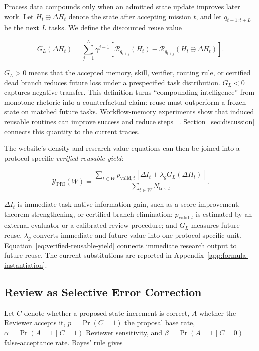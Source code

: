 Process data compounds only when an admitted state update improves later work. Let
$H_t\oplus\Delta H_t$ denote the state after accepting mission $t$, and let
$q_{t+1:t+L}$ be the next $L$ tasks. We define the discounted reuse value

\begin{equation}
  G_L(\Delta H_t)
  =\sum_{j=1}^{L}\gamma^{j-1}
  \left[
    \mathcal{R}_{q_{t+j}}(H_t)
    -\mathcal{R}_{q_{t+j}}(H_t\oplus\Delta H_t)
  \right].
  \label{eq:reuse-gain}
\end{equation}

$G_L>0$ means that the accepted memory, skill, verifier, routing rule, or certified
dead branch reduces future loss under a prespecified task distribution. $G_L<0$
captures negative transfer. This definition turns ``compounding intelligence''
from monotone rhetoric into a counterfactual claim: reuse must outperform a frozen
state on matched future tasks. Workflow-memory experiments show that induced
reusable routines can improve success and reduce steps
~\citep{wang2024workflowmemory}. Section~\ref{sec:discussion} connects this quantity
to the current \systemname traces.

The website's density and research-value equations can then be joined into a
protocol-specific \emph{verified reusable yield}:

\begin{equation}
  \mathcal{Y}_{\mathrm{PRI}}(W)
  =\frac{
    \sum_{t\in W}p_{\mathrm{valid},t}
    \left[\Delta I_t+\lambda_g G_L(\Delta H_t)\right]
  }{
    \sum_{t\in W}N_{\mathrm{tok},t}
  }.
  \label{eq:verified-reusable-yield}
\end{equation}

$\Delta I_t$ is immediate task-native information gain, such as a score
improvement, theorem strengthening, or certified branch elimination;
$p_{\mathrm{valid},t}$ is estimated by an external evaluator or a calibrated review
procedure; and $G_L$ measures future reuse. $\lambda_g$ converts immediate and
future value into one protocol-specific unit. Equation~\ref{eq:verified-reusable-yield}
connects immediate research output to future reuse. The current substitutions are
reported in Appendix~\ref{app:formula-instantiation}.

\subsection{Review as Selective Error Correction}

Let $C$ denote whether a proposed state increment is correct, $A$ whether the
Reviewer accepts it, $p=\Pr(C=1)$ the proposal base rate,
$\alpha=\Pr(A=1\mid C=1)$ Reviewer sensitivity, and
$\beta=\Pr(A=1\mid C=0)$ false-acceptance rate. Bayes' rule gives

